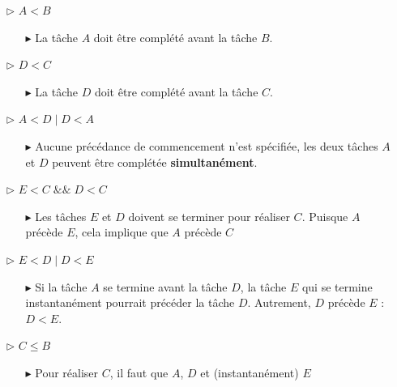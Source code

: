 \documentclass{report}
\begin{document}
\begin{multicols*}{2}
\begin{center}
{
    }
\end{center}
\begin{itemize}
    \item [$\rhd$ ] $A < B$ 
        \begin{itemize}
            \item [$\blacktriangleright$ ] La tâche $A$ doit être complété avant la tâche $B$.
        \end{itemize}
    \item [$\rhd$ ] $D < C$ 
        \begin{itemize}
            \item [$\blacktriangleright$ ] La tâche $D$ doit être complété avant la tâche $C$.
        \end{itemize}
    \item [$\rhd$ ] $A < D \; | \; D < A$
        \begin{itemize}
            \item [$\blacktriangleright$ ] Aucune précédance 
                de commencement n'est spécifiée, les deux tâches 
                $A$ et $D$ 
                peuvent être complétée \textbf{simultanément}.  
        \end{itemize}
    \item [$\rhd$ ] $E < C \; \&\& \; D < C$
        \begin{itemize}
            \item [$\blacktriangleright$ ] Les tâches $E$ et $D$ doivent 
                se terminer pour réaliser $C$. Puisque $A$ précède $E$, 
                cela implique que $A$ précède $C$ 
        \end{itemize}
    \item [$\rhd$ ] $E < D \; | \; D < E$
        \begin{itemize}
            \item [$\blacktriangleright$ ] Si la tâche $A$ se termine avant la tâche $D$, 
                la tâche $E$ qui se termine instantanément pourrait précéder 
                la tâche $D$. Autrement, $D$ précède $E$ : $D < E$.
        \end{itemize}
    \item [$\rhd$ ] $C \leq B$
        \begin{itemize}
            \item [$\blacktriangleright$ ] 
                Pour réaliser $C$, il faut que $A$, $D$ et (instantanément) $E$ 

\end{itemize}
\end{itemize}
\end{multicols*}
\end{document}
